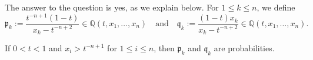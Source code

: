 \documentclass[12pt]{amsart}
\theoremstyle{definition}
\newtheorem{notation}[thm]{Notation}
\newcommand{\QQ}{\mathbb Q}
\newcommand{\mfp}{\mathfrak p}
\newcommand{\mfq}{\mathfrak q}
\begin{document}
The answer to the question is yes, as we 
explain below.  
 For $1\leq k\leq n$, we define
\begin{equation}\label{eq:1minuspk}
\mfp_k:=\frac{t^{-n+1}(1-t)}{x_k-t^{-n+2}}
\in \QQ(t,x_1,\dots,x_n) \quad \text{and}\quad \mfq_k:= \frac{(1-t)x_k}{x_k-t^{-n+2}}\in \QQ(t,x_1,\dots,x_n).
\end{equation}

If  $0<t<1$ and $x_i>t^{-n+1}$ for $1\leq i\leq n$, then $\mfp_k$ and $\mfq_k$ are probabilities. 
\end{document}
